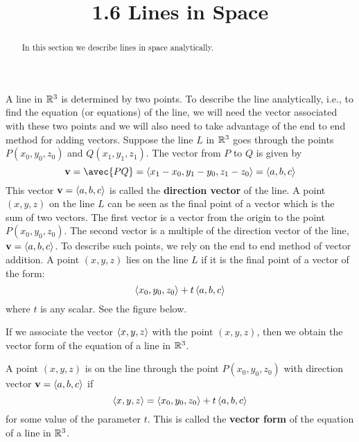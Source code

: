 \documentclass[handout]{ximera}
\title{1.6 Lines in Space}
\begin{document}
\begin{abstract}
In this section we describe lines in space analytically.
\end{abstract}
 
\maketitle

A line in $\mathbb R^3$ is determined by two points. To describe the line analytically, i.e., to find the equation (or equations) of the line,
we will need the vector associated with these two points and we will also need to take advantage of the end to end method for adding vectors.
Suppose the line $L$ in $\mathbb R^3$ goes through the points $P(x_0, y_0, z_0)$ and $Q(x_1, y_1, z_1)$. The vector from $P$ to $Q$ is given by
\[
\vec{v} = \avec{PQ} = \vector{x_1-x_0,y_1-y_0,z_1-z_0} = \vector{a,b,c}
\]
This vector $\mathbf v = \left\langle a,b,c\right\rangle$ is called the \textbf{direction vector} of the line. 
A point $(x, y, z)$ on the line $L$ can be seen as the final point of a vector which is the sum of two vectors.
The first vector is a vector from the origin to the point $P(x_0, y_0, z_0)$.
The second vector is a multiple of the direction vector of the line, $\mathbf v = \left\langle a, b, c\right\rangle$.
To describe such points, we rely on the end to end method of vector addition. A point $(x, y, z)$ lies on the line $L$ if
it is the final point of a vector of the form:
\[
\left\langle x_0, y_0, z_0\right\rangle + t\left\langle a, b, c\right\rangle
\]
where $t$ is any scalar. See the figure below.

\begin{image}
\end{image}
 
If we associate the vector $\left\langle x, y, z\right\rangle$ with the point $(x, y, z)$, then we obtain the vector form of the equation of a line in $\mathbb R^3$.

\begin{definition}
A point $(x, y, z)$ is on the line through the point $P(x_0, y_0, z_0)$ with direction vector $\mathbf v = \left\langle a, b, c\right\rangle$
if
\[
\left\langle x, y, z\right\rangle = \left\langle x_0, y_0, z_0\right\rangle + t\left\langle a, b, c\right\rangle
\]
for some value of the parameter $t$.
This is called the {\bf vector form} of the equation of a line in $\mathbb R^3$.
\end{definition}
\end{document}
